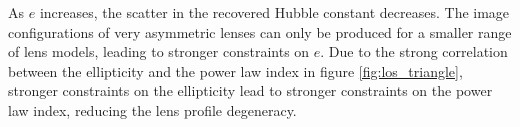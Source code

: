 As $e$ increases, the scatter in the recovered Hubble constant decreases. The image configurations of very asymmetric lenses can only be produced for a smaller range of lens models, leading to stronger constraints on $e$. Due to the strong correlation between the ellipticity and the power law index in figure \ref{fig:los_triangle}, stronger constraints on the ellipticity lead to stronger constraints on the power law index, reducing the lens profile degeneracy. 